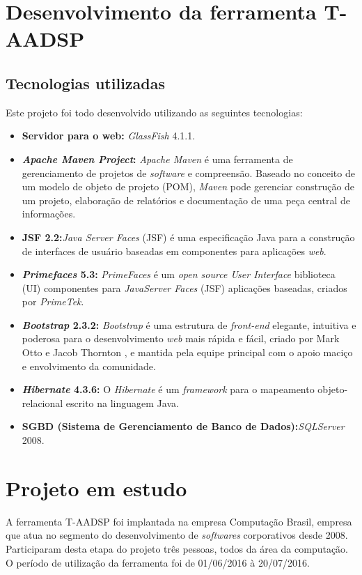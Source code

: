 \documentclass{acm_proc_article-sp}
\begin{document}
\section{Desenvolvimento da ferramenta T-AADSP}
\subsection{Tecnologias utilizadas}
Este projeto foi todo desenvolvido utilizando as seguintes tecnologias:

\begin{itemize}
\item \textbf{Servidor para o web:} \textit{GlassFish} 4.1.1. 
\item \textbf{\textit{Apache Maven Project}:} \textit{Apache Maven} é uma ferramenta de gerenciamento de projetos de \textit{software} e compreensão. Baseado no conceito de um modelo de objeto de projeto (POM), \textit{Maven} pode gerenciar construção de um projeto, elaboração de relatórios e documentação de uma peça central de informações.
\item \textbf{JSF 2.2:}\textit{Java Server Faces} (JSF) é uma especificação Java para a construção de interfaces de usuário baseadas em componentes para aplicações \textit{web}.
\item \textbf{\textit{Primefaces} 5.3:} \textit{PrimeFaces} é um \textit{open source User Interface} biblioteca (UI) componentes para \textit{JavaServer Faces} (JSF) aplicações baseadas, criados por \textit{PrimeTek}.  
\item \textbf{\textit{Bootstrap} 2.3.2:} \textit{Bootstrap} é uma estrutura de \textit{front-end} elegante, intuitiva e poderosa para o desenvolvimento \textit{web} mais rápida e fácil, criado por Mark Otto e Jacob Thornton , e mantida pela equipe principal com o apoio maciço e envolvimento da comunidade. 
\item \textbf{\textit{Hibernate} 4.3.6:} O \textit{Hibernate} é um \textit{framework} para o mapeamento objeto-relacional escrito na linguagem Java. 
\item \textbf{SGBD (Sistema de Gerenciamento de Banco de Dados):}\textit{SQLServer} 2008. 
\end{itemize}


\section{Projeto em estudo}
A ferramenta T-AADSP foi implantada na empresa Computação Brasil, empresa que atua no segmento do desenvolvimento de \textit{softwares} corporativos desde 2008. Participaram desta etapa do projeto três pessoas, todos da área da computação. O período de utilização da ferramenta foi de 01/06/2016 à 20/07/2016. 
\end{document}
